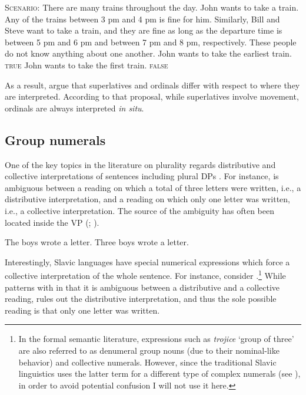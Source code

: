 \documentclass[output=paper]{langscibook}
\begin{document}
		\eanoraggedright\label{ex:superlatives-ordinals-de-dicto} \textsc{Scenario:} There are many trains throughout the day. John wants to take a train. Any of the trains between 3 pm and 4 pm is fine for him. Similarly, Bill and Steve want to take a train, and they are fine as long as the departure time is between 5 pm and 6 pm and between 7 pm and 8 pm, respectively. These people do not know anything about one another.
		\ea John wants to take the earliest train. \hfill \textsc{true}\label{ex:superlatives-de-dicto}
	\ex John wants to take the first train. \hfill \textsc{false}\label{ex:ordinals-de-dicto}
	\z
	\z
	
	\noindent As a result, \citet{bylinina_et-al2015insitu} argue that superlatives and ordinals differ with respect to where they are interpreted. According to that proposal, while superlatives involve movement, ordinals are always interpreted \textit{in situ}.
	
	\subsection{Group numerals}\label{sec:group-numerals}
	
	One of the key topics in the literature on plurality regards distributive and collective interpretations of sentences including plural DPs  \citep[][]{scha1981distributive,link83,landman1989groupsi,landman2000events,schwarzschild1996pluralities}. For instance,  is ambiguous between a reading on which a total of three letters were written, i.e., a distributive interpretation, and a reading on which only one letter was written, i.e., a collective interpretation. The source of the ambiguity has often been located inside the VP (\citealt{hoeksema1983plurality,link1984hydras,schwarzschild1991meaning}; \citealt[Ch. 7]{lasersohn1995plurality}). 

	\ea\label{ex:collective} \ea The boys wrote a letter.
	\ex Three boys wrote a letter.\label{ex:collective-numeral}
	\z
	\z
	
\noindent Interestingly, Slavic languages have special numerical expressions which force a collective interpretation of the whole sentence. For instance, consider  \citep{docekal2012atoms,docekal2013numerals}.\footnote{In the formal semantic literature, expressions such as \textit{trojice} `group of three' are also referred to as denumeral group nouns (due to their nominal-like behavior) and collective numerals. However, since the traditional Slavic linguistics uses the latter term for a different type of complex numerals (see ), in order to avoid potential confusion I will not use it here.} While  patterns with  in that it is ambiguous between a distributive and a collective reading,  rules out the distributive interpretation, and thus the sole possible reading is that only one letter was written.
\end{document}
